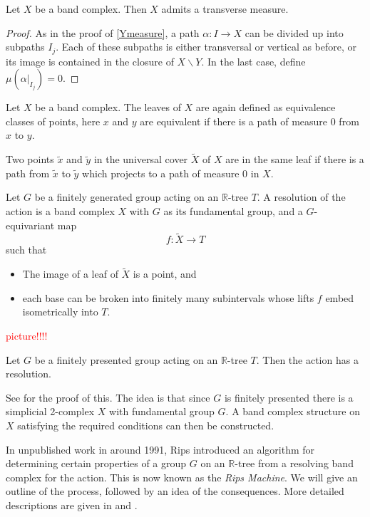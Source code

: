 \begin{lemma}
    Let $X$ be a band complex. Then $X$ admits a transverse measure. 
\end{lemma}
\begin{proof}
    As in the proof of \ref{Ymeasure}, a path $\alpha:I\rightarrow X$ can be divided up into subpaths $I_j$. Each of these subpaths is either transversal or vertical as before, or its image is contained in the closure of $X\backslash Y$. In the last case, define $\mu(\alpha\vert_{I_j})=0$.
\end{proof}

Let $X$ be a band complex. The leaves of $X$ are again defined as equivalence classes of points, here $x$ and $y$ are equivalent if there is a path of measure 0 from $x$ to $y$. 

Two points $\tilde{x}$ and $\tilde{y}$ in the universal cover $\tilde{X}$ of $X$ are in the same leaf if there is a path from $\tilde{x}$ to $\tilde{y}$ which projects to a path of measure 0 in $X$. 

\begin{definition}
    Let $G$ be a finitely generated group acting on an $\mathbb{R}$-tree $T$. A \textnormal{resolution} of the action is a band complex $X$ with $G$ as its fundamental group, and a $G$-equivariant map \[f:\tilde{X}\rightarrow T\] such that 
    \begin{itemize}
        \item The image of a leaf of $\tilde{X}$ is a point, and
        \item each base can be broken into finitely many subintervals whose lifts $f$ embed isometrically into $T$.
    \end{itemize}
\end{definition}
\textcolor{red}{picture!!!!}


\begin{theorem}
    Let $G$ be a finitely presented group acting on an $\mathbb{R}$-tree $T$. Then the action has a resolution.
\end{theorem}
See \cite{Wilton} for the proof of this. The idea is that since $G$ is finitely presented there is a simplicial 2-complex $X$ with fundamental group $G$. A band complex structure on $X$ satisfying the required conditions can then be constructed.

In unpublished work in around 1991, Rips introduced an algorithm for determining certain properties of a group $G$ on an $\mathbb{R}$-tree from a resolving band complex for the action. This is now known as the \textit{Rips Machine}. We will give an outline of the process, followed by an idea of the consequences. More detailed descriptions are given in \cite{Wilton} and \cite{Bestvina_trees}.

